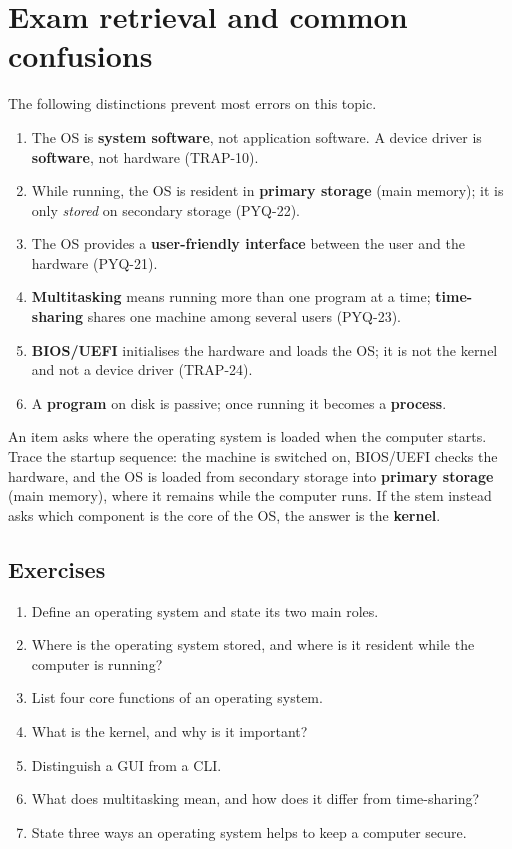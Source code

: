 \section{Exam retrieval and common confusions}
The following distinctions prevent most errors on this topic.
\begin{enumerate}
  \item The OS is \textbf{system software}, not application software. A device
    driver is \textbf{software}, not hardware (TRAP-10).
  \item While running, the OS is resident in \textbf{primary storage} (main
    memory); it is only \emph{stored} on secondary storage (PYQ-22).
  \item The OS provides a \textbf{user-friendly interface} between the user and
    the hardware (PYQ-21).
  \item \textbf{Multitasking} means running more than one program at a time;
    \textbf{time-sharing} shares one machine among several users (PYQ-23).
  \item \textbf{BIOS/UEFI} initialises the hardware and loads the OS; it is not
    the kernel and not a device driver (TRAP-24).
  \item A \textbf{program} on disk is passive; once running it becomes a
    \textbf{process}.
\end{enumerate}

\begin{example}
An item asks where the operating system is loaded when the computer starts.
Trace the startup sequence: the machine is switched on, BIOS/UEFI checks the
hardware, and the OS is loaded from secondary storage into \textbf{primary
storage} (main memory), where it remains while the computer runs. If the stem
instead asks which component is the core of the OS, the answer is the
\textbf{kernel}.
\end{example}

\subsection*{Exercises}
\begin{enumerate}[label=\arabic*.]
  \item Define an operating system and state its two main roles.
  \item Where is the operating system stored, and where is it resident while
    the computer is running?
  \item List four core functions of an operating system.
  \item What is the kernel, and why is it important?
  \item Distinguish a GUI from a CLI.
  \item What does multitasking mean, and how does it differ from
    time-sharing?
  \item State three ways an operating system helps to keep a computer secure.
\end{enumerate}

